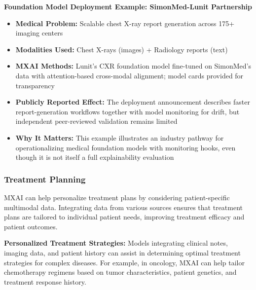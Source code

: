 \documentclass[pdflatex,sn-mathphys-num]{sn-jnl}%
\theoremstyle{thmstyleone}%
\theoremstyle{thmstyletwo}%
\theoremstyle{thmstylethree}%
\begin{document}
\begin{itemize}
     \textbf{Foundation Model Deployment Example: SimonMed-Lunit Partnership}
    \begin{itemize}
        \item \textbf{Medical Problem:} Scalable chest X-ray report generation across 175+ imaging centers
        \item \textbf{Modalities Used:} Chest X-rays (images) + Radiology reports (text)
        \item \textbf{MXAI Methods:} Lunit's CXR foundation model fine-tuned on SimonMed's data with attention-based cross-modal alignment; model cards provided for transparency
        \item \textbf{Publicly Reported Effect:} The deployment announcement describes faster report-generation workflows together with model monitoring for drift, but independent peer-reviewed validation remains limited \cite{lunit2025simonmed}
        \item \textbf{Why It Matters:} This example illustrates an industry pathway for operationalizing medical foundation models with monitoring hooks, even though it is not itself a full explainability evaluation \cite{lunit2025simonmed}
    \end{itemize}



\subsubsection{Treatment Planning}

MXAI can help personalize treatment plans by considering patient-specific multimodal data. Integrating data from various sources ensures that treatment plans are tailored to individual patient needs, improving treatment efficacy and patient outcomes.


    \textbf{Personalized Treatment Strategies:} Models integrating clinical notes, imaging data, and patient history can assist in determining optimal treatment strategies for complex diseases. For example, in oncology, MXAI can help tailor chemotherapy regimens based on tumor characteristics, patient genetics, and treatment response history.


\end{itemize}
\end{document}
